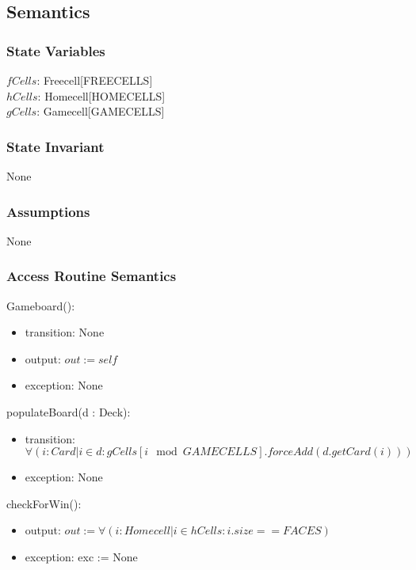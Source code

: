 \documentclass[12pt]{article}
\begin{document}
\subsection* {Semantics}

\subsubsection* {State Variables}

$fCells$: Freecell[FREECELLS]\\
$hCells$: Homecell[HOMECELLS]\\
$gCells$: Gamecell[GAMECELLS]

\subsubsection* {State Invariant}

None

\subsubsection* {Assumptions}

None

\subsubsection* {Access Routine Semantics}

Gameboard():
\begin{itemize}
	\item transition: None
	\item output: $out := \mathit{self}$
	\item exception: None
\end{itemize}

\noindent populateBoard(d : Deck):
\begin{itemize}
	\item transition: $\forall(i : Card | i \in d : gCells[i \mod GAMECELLS].forceAdd(d.getCard(i)))$
	\item exception: None
\end{itemize}

\noindent checkForWin():
\begin{itemize}
	\item output: $out := \forall(i : Homecell | i \in hCells : i.size == FACES)$
	\item exception: exc := None
\end{itemize}
\end{document}
